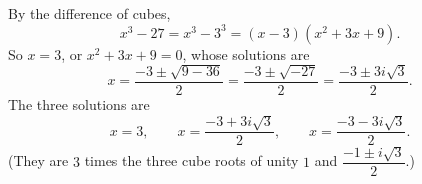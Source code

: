 By the difference of cubes,
\[x^3-27=x^3-3^3=(x-3)\left(x^2+3x+9\right).\]
So $x=3$, or $x^2+3x+9=0$, whose solutions are
\[x=\dfrac{-3\pm\sqrt{9-36}}{2}=\dfrac{-3\pm\sqrt{-27}}{2}=\dfrac{-3\pm3i\sqrt3}{2}.\]
The three solutions are
\[\boxed{x=3,\qquad x=\dfrac{-3+3i\sqrt3}{2},\qquad x=\dfrac{-3-3i\sqrt3}{2}}.\]
(They are $3$ times the three cube roots of unity $1$ and $\dfrac{-1\pm i\sqrt3}{2}$.)
